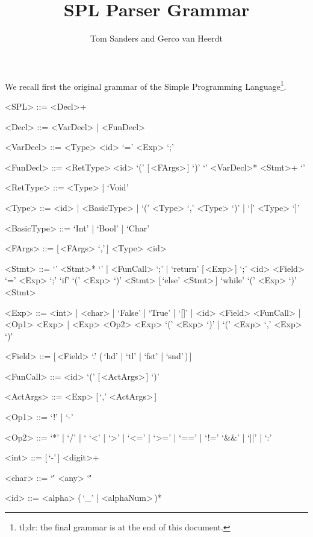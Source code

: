 \documentclass{article}
\title{SPL Parser Grammar}
\author{Tom Sanders and Gerco van Heerdt}
\begin{document}
\maketitle

We recall first the original grammar of the Simple Programming Language\footnote{%
    tl;dr: the final grammar is at the end of this document.
}.
\setlength{\grammarindent}{6.8em}
\begin{grammar}
    <SPL> ::= <Decl>+

    <Decl> ::= <VarDecl> | <FunDecl>

    <VarDecl> ::= <Type> <id> `=' <Exp> `;'

    <FunDecl> ::= <RetType> <id> `(' [\,<FArgs>\,] `)' `{' <VarDecl>* <Stmt>+ `}'

    <RetType> ::= <Type> | `Void'

    <Type> ::= <id> | <BasicType> | `(' <Type> `,' <Type> `)' | `[' <Type> `]'

    <BasicType> ::= `Int' | `Bool' | `Char'

    <FArgs> ::= [\,<FArgs> `,'\,] <Type> <id>

    <Stmt> ::= `{' <Stmt>* `}' | <FunCall> `;' | `return' [\,<Exp>\,] `;'
    \alt <id> <Field> `=' <Exp> `;'
    \alt `if' `(' <Exp> `)' <Stmt> [\,`else' <Stmt>\,]
    \alt `while' `(' <Exp> `)' <Stmt>

    <Exp> ::= <int> | <char> | `False' | `True' | `[]' | <id> <Field>
    \alt <FunCall> | <Op1> <Exp> | <Exp> <Op2> <Exp>
    \alt `(' <Exp> `)' | `(' <Exp> `,' <Exp> `)'

    <Field> ::= [\,<Field> `.' (\,`hd' | `tl' | `fst' | `snd'\,)\,]

    <FunCall> ::= <id> `(' [\,<ActArgs>\,] `)'

    <ActArgs> ::= <Exp> [\,`,' <ActArgs>\,]

    <Op1> ::= `!' | `-'

    <Op2> ::=  `*' | `/' | `%
    \alt `<' | `>' | `<=' | `>=' | `==' | `!='
    \alt `&&' | `||' | `:'

    <int> ::= [\,`-'\,] <digit>+

    <char> ::= `\'' <any> `\''

    <id> ::= <alpha> (\,`_' | <alphaNum>\,)*
\end{grammar}
\end{document}
